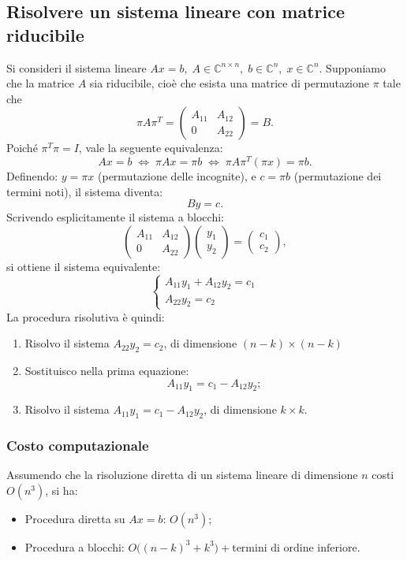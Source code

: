 \documentclass[12pt,a4paper,]{report}
\begin{document}
\subsection{Risolvere un sistema lineare con matrice riducibile}
Si consideri il sistema lineare
$
Ax = b, \; A \in \mathbb{C}^{n \times n}, \; b \in \mathbb{C}^n, \; x \in \mathbb{C}^n.
$
Supponiamo che la matrice \(A\) sia riducibile, cioè che esista una matrice di permutazione \(\pi\) tale che
\[
\pi A \pi^T =
\begin{pmatrix}
A_{11} & A_{12} \\
0      & A_{22}
\end{pmatrix}
= B.
\]
Poiché \(\pi^T \pi = I\), vale la seguente equivalenza:
\[
Ax = b 
\;\Longleftrightarrow\;
\pi A x = \pi b
\;\Longleftrightarrow\;
\pi A \pi^T (\pi x) = \pi b.
\]
Definendo:
$y = \pi x$ (permutazione delle incognite), e 
$c = \pi b$ (permutazione dei termini noti),
il sistema diventa:
\[
By = c.
\]
Scrivendo esplicitamente il sistema a blocchi:
\[
\begin{pmatrix}
A_{11} & A_{12} \\
0      & A_{22}
\end{pmatrix}
\begin{pmatrix}
y_1 \\
y_2
\end{pmatrix}
=
\begin{pmatrix}
c_1 \\
c_2
\end{pmatrix},
\]
si ottiene il sistema equivalente:
\[
\begin{cases}
A_{11} y_1 + A_{12} y_2 = c_1 \\
A_{22} y_2 = c_2
\end{cases}
\]
La procedura risolutiva è quindi:
\begin{enumerate}
  \item Risolvo il sistema \(A_{22} y_2 = c_2\), di dimensione \((n-k) \times (n-k)\)
  \item Sostituisco nella prima equazione:
  \[
  A_{11} y_1 = c_1 - A_{12} y_2;
  \]
  \item Risolvo il sistema \(A_{11} y_1 = c_1 - A_{12} y_2\), di dimensione \(k \times k\).
\end{enumerate}

\subsubsection{Costo computazionale}

Assumendo che la risoluzione diretta di un sistema lineare di dimensione \(n\) costi \(O(n^3)\), si ha:
\begin{itemize}
  \item Procedura diretta su \(Ax=b\): \(O(n^3)\);
  \item Procedura a blocchi:
  $O\bigl((n-k)^3 + k^3\bigr) + \text{termini di ordine inferiore}.$
\end{itemize}
\end{document}
